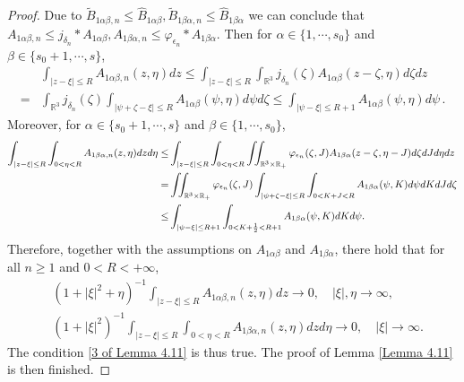\documentclass[reqno,11pt]{amsart}
\numberwithin{equation}{section}
\def\R{\mathbb{R}}
\begin{document}
\begin{proof}
Due to $\tilde{B}_{1\alpha \beta ,n}\leq \hat{B}_{1\alpha \beta}, \tilde{B}_{1\beta \alpha ,n} \leq \hat{B}_{1\beta \alpha }$ we can conclude that $A_{1\alpha \beta ,n } \leq j_{\delta_n}* A_{1\alpha \beta },A_{1\beta \alpha ,n } \leq \varphi_{\epsilon_n}* A_{1\beta \alpha }.$ Then for $\alpha\in \{1,\cdots,s_0\} $ and $ \beta \in \{s_0+1,\cdots,s\}$,
	\begin{equation*}
		\begin{aligned}
			& \int_{|z-\xi|\leq R}  A_{1\alpha \beta ,n } (z,\eta )dz
			\leq \int_{|z-\xi|\leq R} \int_{\R^3} j_{\delta_n}(\zeta ) A_{1\alpha \beta } (z-\zeta ,\eta ) d\zeta dz\\
			= & \int_{\R^3} j_{\delta_n}(\zeta ) \int_{|\psi +\zeta - \xi |\leq R} A_{1\alpha \beta }(\psi ,\eta) d\psi d\zeta \leq \int_{|\psi - \xi |\leq R+1}A_{1\alpha \beta }(\psi,\eta ) d\psi \,.
		\end{aligned}
	\end{equation*}
Moreover, for $\alpha\in \{s_0+1,\cdots,s\} $ and $ \beta \in \{1,\cdots,s_0\}$,
	\begin{equation*}{\small
		\begin{aligned}
			\int_{|z-\xi|\leq R} \int_{0< \eta <R } A_{1\beta\alpha ,n } (z,\eta )dzd\eta \leq& \int_{|z-\xi|\leq R}\int_{0< \eta <R } \iint_{\R^3\times \R_+} \varphi_{\epsilon_n} (\zeta ,J) A_{1\beta\alpha } (z-\zeta ,\eta - J ) d\zeta dJ d\eta dz \\
			= & \iint_{\R^3\times \R_+} \varphi_{\epsilon_n}(\zeta ,J) \int_{|\psi +\zeta - \xi |\leq R} \int_{0< K + J <R } A_{1\beta\alpha }  (\psi , K) d\psi dK dJ d\zeta \\
			\leq & \int_{|\psi - \xi |\leq R+1} \int_{0< K +\frac{1}{2}<R+1} A_{1\beta\alpha }(\psi , K) dK d\psi.
		\end{aligned}}
	\end{equation*}
	Therefore, together with the assumptions on $A_{1\alpha \beta }$ and $A_{1\beta\alpha }$, there hold that for all $ n \geq 1 $ and $0 < R< +\infty$,
		\begin{align*}
			& (1+|\xi|^2 + \eta )^{-1} \int_{|z-\xi |\leq R }  A_{1\alpha \beta ,n } (z,\eta ) dz\rightarrow 0, \quad |\xi|, \eta \rightarrow \infty , \\
			&(1+|\xi|^2 )^{-1} \int_{|z-\xi|\leq R} \int_{0< \eta <R } A_{1\beta\alpha ,n } (z,\eta )dzd\eta\rightarrow 0, \quad |\xi| \rightarrow \infty .
		\end{align*}
	The condition \eqref{3 of Lemma 4.11} is thus true. The proof of Lemma \ref{Lemma 4.11} is then finished.
\end{proof}
\end{document}
